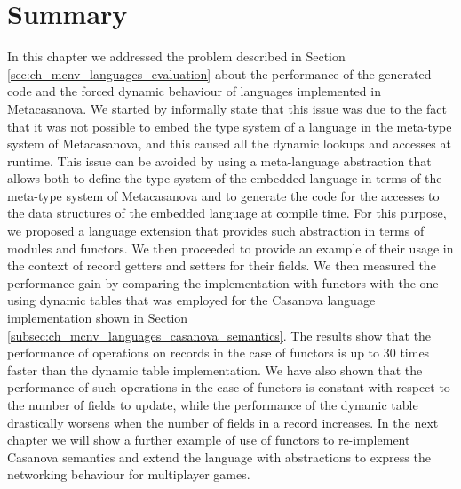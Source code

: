 \section{Summary}
In this chapter we addressed the problem described in Section \ref{sec:ch_mcnv_languages_evaluation} about the performance of the generated code and the forced dynamic behaviour of languages implemented in Metacasanova. We started by informally state that this issue was due to the fact that it was not possible to embed the type system of a language in the meta-type system of Metacasanova, and this caused all the dynamic lookups and accesses at runtime. This issue can be avoided by using a meta-language abstraction that allows both to define the type system of the embedded language in terms of the meta-type system of Metacasanova and to generate the code for the accesses to the data structures of the embedded language at compile time. For this purpose, we proposed a language extension that provides such abstraction in terms of modules and functors. We then proceeded to provide an example of their usage in the context of record getters and setters for their fields. We then measured the performance gain by comparing the implementation with functors with the one using dynamic tables that was employed for the Casanova language implementation shown in Section \ref{subsec:ch_mcnv_languages_casanova_semantics}. The results show that the performance of operations on records in the case of functors is up to 30 times faster than the dynamic table implementation. We have also shown that the performance of such operations in the case of functors is constant with respect to the number of fields to update, while the performance of the dynamic table drastically worsens when the number of fields in a record increases. In the next chapter we will show a further example of use of functors to re-implement Casanova semantics and extend the language with abstractions to express the networking behaviour for multiplayer games.
